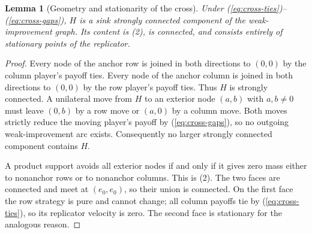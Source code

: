 \documentclass[11pt]{article}
\newtheorem{lemma}{Lemma}
\theoremstyle{definition}
\theoremstyle{remark}
\begin{document}
\begin{lemma}[Geometry and stationarity of the cross]\label{lem:cross}
Under (\ref{eq:cross-ties})--(\ref{eq:cross-gaps}), $H$ is a sink strongly
connected component of the weak-improvement graph. Its content is (2), is
connected, and consists entirely of stationary points of the replicator.
\end{lemma}
\begin{proof}
Every node of the anchor row is joined in both directions to $(0,0)$ by
the column player's payoff ties. Every node of the anchor column is joined
in both directions to $(0,0)$ by the row player's payoff ties. Thus $H$ is
strongly connected. A unilateral move from $H$ to an exterior node
$(a,b)$ with $a,b\neq0$ must leave $(0,b)$ by a row move or $(a,0)$ by a
column move. Both moves strictly reduce the moving player's payoff by
(\ref{eq:cross-gaps}), so no outgoing weak-improvement arc exists.
Consequently no larger strongly connected component contains $H$.

A product support avoids all exterior nodes if and only if it gives zero
mass either to nonanchor rows or to nonanchor columns. This is (2).
The two faces are connected and meet at $(e_0,e_0)$, so their union is
connected. On the first face the row strategy is pure and cannot change;
all column payoffs tie by (\ref{eq:cross-ties}), so its replicator velocity
is zero. The second face is stationary for the analogous reason.
\end{proof}
\end{document}
